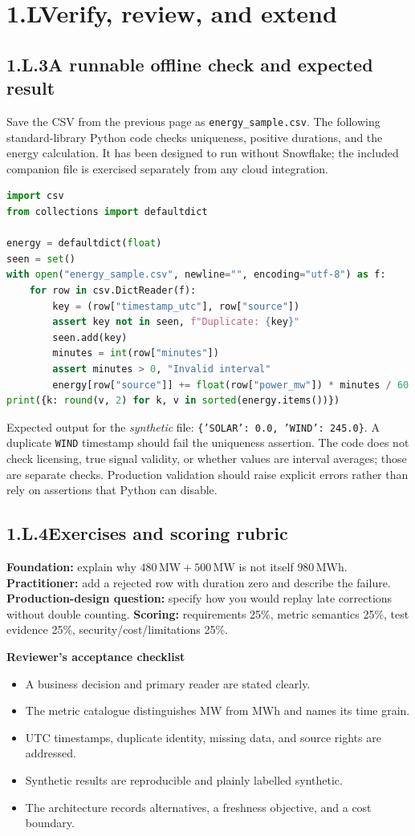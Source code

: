 \documentclass[11pt,twoside]{article}
\newcommand{\topic}[2]{\subsection*{#1\quad #2}}
\begin{document}
\section*{1.L\quad Verify, review, and extend}
\topic{1.L.3}{A runnable offline check and expected result}
Save the CSV from the previous page as \texttt{energy\_sample.csv}. The following standard-library Python code checks uniqueness, positive durations, and the energy calculation. It has been designed to run without Snowflake; the included companion file is exercised separately from any cloud integration.
\begin{lstlisting}[language=Python,caption={Synthetic energy validation (chapter01\_lab.py).}]
import csv
from collections import defaultdict

energy = defaultdict(float)
seen = set()
with open("energy_sample.csv", newline="", encoding="utf-8") as f:
    for row in csv.DictReader(f):
        key = (row["timestamp_utc"], row["source"])
        assert key not in seen, f"Duplicate: {key}"
        seen.add(key)
        minutes = int(row["minutes"])
        assert minutes > 0, "Invalid interval"
        energy[row["source"]] += float(row["power_mw"]) * minutes / 60
print({k: round(v, 2) for k, v in sorted(energy.items())})
\end{lstlisting}
Expected output for the \emph{synthetic} file: \texttt{\{'SOLAR': 0.0, 'WIND': 245.0\}}. A duplicate \texttt{WIND} timestamp should fail the uniqueness assertion. The code does not check licensing, true signal validity, or whether values are interval averages; those are separate checks. Production validation should raise explicit errors rather than rely on assertions that Python can disable.
\topic{1.L.4}{Exercises and scoring rubric}
\textbf{Foundation:} explain why \(480\,\mathrm{MW}+500\,\mathrm{MW}\) is not itself \(980\,\mathrm{MWh}\). \textbf{Practitioner:} add a rejected row with duration zero and describe the failure. \textbf{Production-design question:} specify how you would replay late corrections without double counting. \textbf{Scoring:} requirements 25\%, metric semantics 25\%, test evidence 25\%, security/cost/limitations 25\%.

\begin{whitebox}
\textbf{Reviewer's acceptance checklist}\par
\begin{itemize}
\item A business decision and primary reader are stated clearly.
\item The metric catalogue distinguishes MW from MWh and names its time grain.
\item UTC timestamps, duplicate identity, missing data, and source rights are addressed.
\item Synthetic results are reproducible and plainly labelled synthetic.
\item The architecture records alternatives, a freshness objective, and a cost boundary.
\end{itemize}
\end{whitebox}
\end{document}
